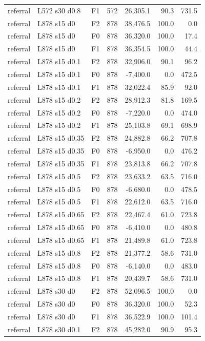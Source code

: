 \begin{longtable}{p{1.8cm}p{3.35cm}lrrrr}
referral & L572 s30 d0.8 & F1 & 572 & 26,305.1 & 90.3 & 731.5\\
referral & L878 s15 d0 & F2 & 878 & 38,476.5 & 100.0 & 0.0\\
referral & L878 s15 d0 & F0 & 878 & 36,320.0 & 100.0 & 17.4\\
referral & L878 s15 d0 & F1 & 878 & 36,354.5 & 100.0 & 44.4\\
referral & L878 s15 d0.1 & F2 & 878 & 32,906.0 & 90.1 & 96.2\\
referral & L878 s15 d0.1 & F0 & 878 & -7,400.0 & 0.0 & 472.5\\
referral & L878 s15 d0.1 & F1 & 878 & 32,022.4 & 85.9 & 92.0\\
referral & L878 s15 d0.2 & F2 & 878 & 28,912.3 & 81.8 & 169.5\\
referral & L878 s15 d0.2 & F0 & 878 & -7,220.0 & 0.0 & 474.0\\
referral & L878 s15 d0.2 & F1 & 878 & 25,103.8 & 69.1 & 698.9\\
referral & L878 s15 d0.35 & F2 & 878 & 24,882.8 & 66.2 & 707.8\\
referral & L878 s15 d0.35 & F0 & 878 & -6,950.0 & 0.0 & 476.2\\
referral & L878 s15 d0.35 & F1 & 878 & 23,813.8 & 66.2 & 707.8\\
referral & L878 s15 d0.5 & F2 & 878 & 23,633.2 & 63.5 & 716.0\\
referral & L878 s15 d0.5 & F0 & 878 & -6,680.0 & 0.0 & 478.5\\
referral & L878 s15 d0.5 & F1 & 878 & 22,612.0 & 63.5 & 716.0\\
referral & L878 s15 d0.65 & F2 & 878 & 22,467.4 & 61.0 & 723.8\\
referral & L878 s15 d0.65 & F0 & 878 & -6,410.0 & 0.0 & 480.8\\
referral & L878 s15 d0.65 & F1 & 878 & 21,489.8 & 61.0 & 723.8\\
referral & L878 s15 d0.8 & F2 & 878 & 21,377.2 & 58.6 & 731.0\\
referral & L878 s15 d0.8 & F0 & 878 & -6,140.0 & 0.0 & 483.0\\
referral & L878 s15 d0.8 & F1 & 878 & 20,439.7 & 58.6 & 731.0\\
referral & L878 s30 d0 & F2 & 878 & 52,096.5 & 100.0 & 0.0\\
referral & L878 s30 d0 & F0 & 878 & 36,320.0 & 100.0 & 52.3\\
referral & L878 s30 d0 & F1 & 878 & 36,522.9 & 100.0 & 101.4\\
referral & L878 s30 d0.1 & F2 & 878 & 45,282.0 & 90.9 & 95.3\\

\end{longtable}
